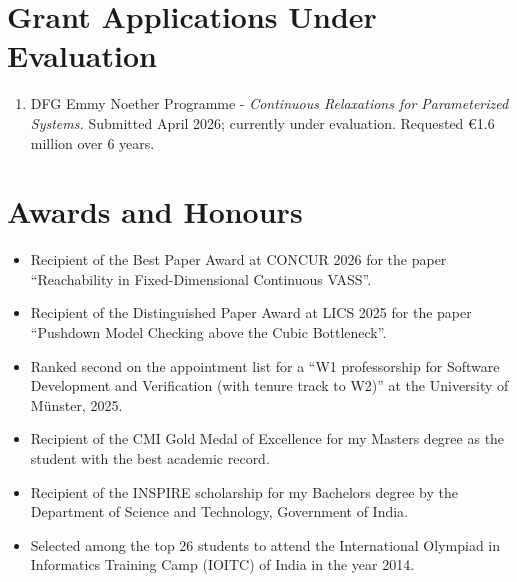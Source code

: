 \documentclass[11pt,a4paper,sans]{moderncv}        %
\begin{document}
\section{Grant Applications Under Evaluation}
\begin{enumerate}
	\setlength\itemsep{2pt}
	\item DFG Emmy Noether Programme - \emph{Continuous Relaxations for Parameterized Systems.} Submitted April 2026; currently under evaluation. Requested €1.6 million over 6 years.
\end{enumerate}


\section{Awards and Honours}

\vspace{2pt}

\begin{itemize}

	\item{Recipient of the Best Paper Award at CONCUR 2026 for the paper ``Reachability in Fixed-Dimensional Continuous VASS''.}
	
	\item{Recipient of the Distinguished Paper Award at LICS 2025 for the paper ``Pushdown Model Checking above the Cubic Bottleneck''.}

	\item{Ranked second on the appointment list for a ``W1 professorship for Software Development and Verification (with tenure track to W2)'' at the University of Münster, 2025.}
	
	\item{Recipient of the CMI Gold Medal of Excellence for my Masters degree as the student with the best academic record.}
	
	\vspace{2pt}
	
	\item{Recipient of the INSPIRE scholarship for my Bachelors degree by the Department of Science and Technology, Government of India.}
	
	\vspace{2pt}
	
	\item{Selected among the top 26 students to attend the International Olympiad in Informatics Training Camp (IOITC) of India in the year 2014.}
	
	
	
	
\end{itemize}
\end{document}
